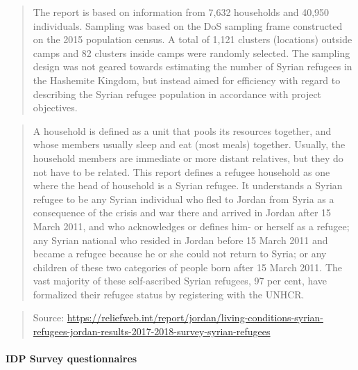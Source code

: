 \documentclass[
]{article}
\begin{document}
\begin{quote}
The report is based on information from 7,632 households and 40,950 individuals. Sampling was based on the DoS sampling frame constructed on the 2015 population census. A total of 1,121 clusters (locations) outside camps and 82 clusters inside camps were randomly selected. The sampling design was not geared towards estimating the number of Syrian refugees in the Hashemite Kingdom, but instead aimed for efficiency with regard to describing the Syrian refugee population in accordance with project objectives.
\end{quote}

\begin{quote}
A household is defined as a unit that pools its resources together, and whose members usually sleep and eat (most meals) together. Usually, the household members are immediate or more distant relatives, but they do not have to be related. This report defines a refugee household as one where the head of household is a Syrian refugee. It understands a Syrian refugee to be any Syrian individual who fled to Jordan from Syria as a consequence of the crisis and war there and arrived in Jordan after 15 March 2011, and who acknowledges or defines him- or herself as a refugee; any Syrian national who resided in Jordan before 15 March 2011 and became a refugee because he or she could not return to Syria; or any children of these two categories of people born after 15 March 2011. The vast majority of these self-ascribed Syrian refugees, 97 per cent, have formalized their refugee status by registering with the UNHCR.
\end{quote}

\begin{quote}
Source: \url{https://reliefweb.int/report/jordan/living-conditions-syrian-refugees-jordan-results-2017-2018-survey-syrian-refugees}
\end{quote}

\hypertarget{b.2.-idp-survey-questionnaires}{%
\paragraph{IDP Survey questionnaires}\label{b.2.-idp-survey-questionnaires}}
\end{document}
